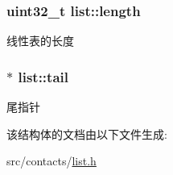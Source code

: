 \subsubsection[{\texorpdfstring{length}{length}}]{\setlength{\rightskip}{0pt plus 5cm}uint32\+\_\+t list\+::length}\hypertarget{structlist_aa550d94029ee5654b79d8f8b6935c0f0}{}\label{structlist_aa550d94029ee5654b79d8f8b6935c0f0}
线性表的长度 
\subsubsection[{\texorpdfstring{tail}{tail}}]{$\ast$ list\+::tail}\hypertarget{structlist_ad53539b1744468c6e2c231061bb9f0b1}{}\label{structlist_ad53539b1744468c6e2c231061bb9f0b1}
尾指针 

该结构体的文档由以下文件生成\+:\begin{DoxyCompactItemize}
\item 
src/contacts/\hyperlink{list_8h}{list.\+h}\end{DoxyCompactItemize}
